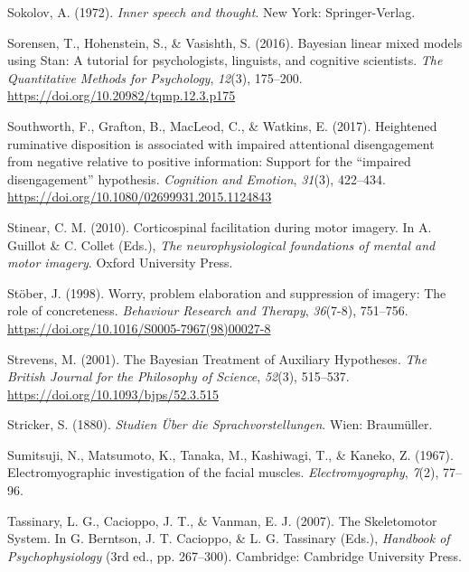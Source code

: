 \documentclass[a4paper,12pt,twoside,openright,oldfontcommands]{memoir}
\begin{document}
\leavevmode\hypertarget{ref-sokolov_inner_1972}{}%
Sokolov, A. (1972). \emph{Inner speech and thought}. New York: Springer-Verlag.

\leavevmode\hypertarget{ref-sorensen_bayesian_2016}{}%
Sorensen, T., Hohenstein, S., \& Vasishth, S. (2016). Bayesian linear mixed models using Stan: A tutorial for psychologists, linguists, and cognitive scientists. \emph{The Quantitative Methods for Psychology}, \emph{12}(3), 175--200. \url{https://doi.org/10.20982/tqmp.12.3.p175}

\leavevmode\hypertarget{ref-southworth_heightened_2017}{}%
Southworth, F., Grafton, B., MacLeod, C., \& Watkins, E. (2017). Heightened ruminative disposition is associated with impaired attentional disengagement from negative relative to positive information: Support for the ``impaired disengagement'' hypothesis. \emph{Cognition and Emotion}, \emph{31}(3), 422--434. \url{https://doi.org/10.1080/02699931.2015.1124843}

\leavevmode\hypertarget{ref-stinear_corticospinal_2010}{}%
Stinear, C. M. (2010). Corticospinal facilitation during motor imagery. In A. Guillot \& C. Collet (Eds.), \emph{The neurophysiological foundations of mental and motor imagery}. Oxford University Press.

\leavevmode\hypertarget{ref-stober_worry_1998}{}%
Stöber, J. (1998). Worry, problem elaboration and suppression of imagery: The role of concreteness. \emph{Behaviour Research and Therapy}, \emph{36}(7-8), 751--756. \url{https://doi.org/10.1016/S0005-7967(98)00027-8}

\leavevmode\hypertarget{ref-strevens_bayesian_2001}{}%
Strevens, M. (2001). The Bayesian Treatment of Auxiliary Hypotheses. \emph{The British Journal for the Philosophy of Science}, \emph{52}(3), 515--537. \url{https://doi.org/10.1093/bjps/52.3.515}

\leavevmode\hypertarget{ref-stricker_studien_1880}{}%
Stricker, S. (1880). \emph{Studien Über die Sprachvorstellungen}. Wien: Braumüller.

\leavevmode\hypertarget{ref-sumitsuji_electromyographic_1967}{}%
Sumitsuji, N., Matsumoto, K., Tanaka, M., Kashiwagi, T., \& Kaneko, Z. (1967). Electromyographic investigation of the facial muscles. \emph{Electromyography}, \emph{7}(2), 77--96.

\leavevmode\hypertarget{ref-berntson_skeletomotor_2007}{}%
Tassinary, L. G., Cacioppo, J. T., \& Vanman, E. J. (2007). The Skeletomotor System. In G. Berntson, J. T. Cacioppo, \& L. G. Tassinary (Eds.), \emph{Handbook of Psychophysiology} (3rd ed., pp. 267--300). Cambridge: Cambridge University Press.
\end{document}
